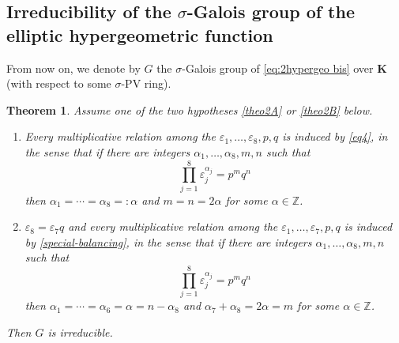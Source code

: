 \documentclass[10pt]{amsart}
\newtheorem{theo}{Theorem}[section]
\theoremstyle{definition}
\newcommand{\Z}{\mathbb Z}
\newcommand\K{\boldsymbol{K}}
\let\s\sigma
\let\Subsection\subsection\let\Subsubsection\subsubsection
\begin{document}
\Subsection{Irreducibility of the $\s$-Galois group of the elliptic hypergeometric function}
From now on, we denote by $G$ the $\s$-Galois group of \eqref{eq:2hypergeo bis} over $\K$ (with respect to some $\s$-PV ring).

\begin{theo}\label{theo2} Assume one of the two hypotheses \eqref{theo2A} or \eqref{theo2B} below.

\begin{enumerate}\renewcommand{\theenumi}{\Alph{enumi}}
\item\label{theo2A}
Every multiplicative relation among the $\varepsilon_{1},\dots,\varepsilon_{8},p,q$ is induced by \eqref{eq4}, in the sense that if there are integers $\alpha_{1},\dots,\alpha_{8},m,n$ such that
\[
\prod_{j=1}^{8}\varepsilon_{j}^{\alpha_{j}} =p^{m}q^{n}
\]
then $\alpha_{1}=\cdots=\alpha_{8}=:\alpha$ and $m=n=2\alpha$ for some $\alpha\in \Z$.

\item\label{theo2B}
$\varepsilon_8=\varepsilon_7q$ and every multiplicative relation among the $\varepsilon_{1},\dots,\varepsilon_{7},p,q$ is induced by \eqref{special-balancing}, in the sense that if there are integers $\alpha_{1},\dots,\alpha_{8},m,n$ such that
\[
\prod_{j=1}^{8}\varepsilon_{j}^{\alpha_{j}} =p^{m}q^{n}
\]
then $\alpha_{1}=\cdots=\alpha_{6}=\alpha=n-\alpha_8$ and $\alpha_7+\alpha_8=2\alpha=m$ for some $\alpha\in \Z$.
\end{enumerate}

Then $G$ is irreducible.
\end{theo}
\end{document}
